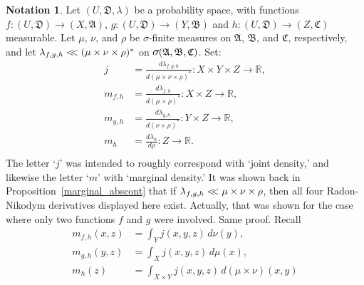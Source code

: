 \documentclass[
twoside=true,
paper=letter,
fontsize=11pt,
pagesize=auto,
leqno,
openany,
headsepline,
overfullrule,
]{scrbook}
\theoremstyle{plain}
\theoremstyle{plain}
\theoremstyle{definition}
\newtheorem{notn}[thm]{Notation}
\theoremstyle{bfnoteitalic}
\theoremstyle{bfnoteroman}
\newcommand{\sigalg}[1]{\mathfrak{#1}}
\newcommand{\textsigma}{\hbox{\large{$\sigma$}}\kern-1pt}
\newcommand{\R}{\mathbb{R}}
\newcommand{\sigmaalgebra}{\sigalg{A}}
\newcommand{\sigmaalgebraii}{\sigalg{B}}
\newcommand{\sigmaalgebraiii}{\sigalg{C}}
\newcommand{\funcf}{f}
\newcommand{\funcg}{g}
\newcommand{\funch}{h}
\newcommand{\funcj}{j}
\newcommand{\function}{f}
\newcommand{\functionii}{g}
\newcommand{\functioniii}{h}
\newcommand{\measurespace}{X}
\newcommand{\measurespaceii}{Y}
\newcommand{\measurespaceiii}{Z}
\newcommand{\mspaceelt}{x}
\newcommand{\mspaceeltii}{y}
\newcommand{\mspaceeltiii}{z}
\newcommand{\abscont}{\mathrel{< \kern-3.5pt <}}
\newcommand{\measure}{\mu}
\newcommand{\measmu}{\mu}
\newcommand{\measureii}{\nu}
\newcommand{\measnu}{\nu}
\newcommand{\measureiii}{\lambda}
\newcommand{\measureiv}{\rho}
\newcommand{\measrho}{\rho}
\newcommand{\uspace}{U}%
\newcommand{\uspacesig}{\sigalg{D}}
\begin{document}
\begin{notn}\label{densities}
Let 
$(\uspace, \uspacesig, \measureiii)$ 
be a probability space, with functions
$\funcf:(\uspace,\uspacesig)\to (\measurespace,\sigmaalgebra)$,
$\funcg:(\uspace,\uspacesig)\to (\measurespaceii,\sigmaalgebraii)$
and
$\funch:(\uspace,\uspacesig)\to (\measurespaceiii,\sigmaalgebraiii)$
measurable.
Let $\measmu$, $\measnu$, and $\measrho$ be \textsigma\hyp{}finite measures on 
$\sigmaalgebra$, $\sigmaalgebraii$, and $\sigmaalgebraiii$, respectively, and let
$\measureiii_{\function,\functionii,\functioniii} \abscont
(\measure\times\measureii\times\measureiv)^*$ on 
$\textsigma(\sigmaalgebra,\sigmaalgebraii,\sigmaalgebraiii)$.
Set:
\begin{align*}
j
& =
\frac{d \measureiii_{\function,\functionii,\functioniii}}
{d(\measure\times\measureii\times\measureiv)^*}
:
\measurespace\times\measurespaceii\times\measurespaceiii\to\R,
\\
m_{\function,\functioniii} 
& =
\frac{d \measureiii_{\function,\functioniii}}
{d(\measure\times\measureiv)^*}:\measurespace\times\measurespaceiii\to\R,
\\
m_{\functionii,\functioniii} 
& =
\frac{d \measureiii_{\functionii,\functioniii}}
{d(\measureii\times\measureiv)^*}:\measurespaceii\times\measurespaceiii\to\R,
\\
m_\functioniii
& =
\frac{d \measureiii_\functioniii}
{d \measureiv}:\measurespaceiii\to\R.
\\
\end{align*}
The letter `$j$' was intended to roughly correspond with `joint density,' and likewise the letter  
`$m$' with `marginal density.' 
It was shown back in Proposition~\ref{marginal_abscont} that if 
$\measureiii_{\function,\functionii,\functioniii} \abscont
\measure\times\measureii\times\measureiv$,
then all four Radon-Nikodym derivatives displayed here exist. Actually, that was shown for the case where only two functions $\function$ and $\functionii$ were involved. Same proof.
Recall
\begin{align*}
m_{\function,\functioniii} (\mspaceelt,\mspaceeltiii)
& =
\int_\measurespaceii
\funcj(\mspaceelt,\mspaceeltii,\mspaceeltiii)\,
d \measnu(\mspaceeltii),
\\
m_{\functionii,\functioniii} (\mspaceeltii,\mspaceeltiii)
& =
\int_\measurespace
\funcj(\mspaceelt,\mspaceeltii,\mspaceeltiii)\,
d \measmu(\mspaceelt),
\\
m_\funch(\mspaceeltiii)
& =
\int_{\measurespace\times\measurespaceii}
\funcj(\mspaceelt,\mspaceeltii,\mspaceeltiii)\,
d(\measmu\times\measnu)(\mspaceelt,\mspaceeltii)
\\
\end{align*}


\end{notn}
\end{document}
